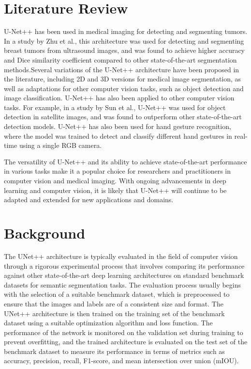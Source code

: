 \documentclass[conference]{IEEEtran}
\begin{document}
\section{Literature Review}

U-Net++ has been used in medical imaging for detecting and segmenting tumors. In a study by Zhu et al., this architecture was used for detecting and segmenting breast tumors from ultrasound images, and was found to achieve higher accuracy and Dice similarity coefficient compared to other state-of-the-art segmentation methods.Several variations of the U-Net++ architecture have been proposed in the literature, including 2D and 3D versions for medical image segmentation, as well as adaptations for other computer vision tasks, such as object detection and image classification.
U-Net++ has also been applied to other computer vision tasks. For example, in a study by Sun et al., U-Net++ was used for object detection in satellite images, and was found to outperform other state-of-the-art detection models. U-Net++ has also been used for hand gesture recognition, where the model was trained to detect and classify different hand gestures in real-time using a single RGB camera.

The versatility of U-Net++ and its ability to achieve state-of-the-art performance in various tasks make it a popular choice for researchers and practitioners in computer vision and medical imaging. With ongoing advancements in deep learning and computer vision, it is likely that U-Net++ will continue to be adapted and extended for new applications and domains.



\section{Background}
The UNet++ architecture is typically evaluated in the field of computer vision through a rigorous experimental process that involves comparing its performance against other state-of-the-art deep learning architectures on standard benchmark datasets for semantic segmentation tasks. The evaluation process usually begins with the selection of a suitable benchmark dataset, which is preprocessed to ensure that the images and labels are of a consistent size and format. The UNet++ architecture is then trained on the training set of the benchmark dataset using a suitable optimization algorithm and loss function. The performance of the network is monitored on the validation set during training to prevent overfitting, and the trained architecture is evaluated on the test set of the benchmark dataset to measure its performance in terms of metrics such as accuracy, precision, recall, F1-score, and mean intersection over union (mIOU). 
\end{document}
